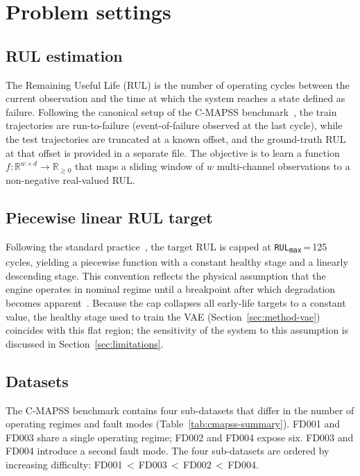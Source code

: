 \documentclass[5p,times,authoryear]{elsarticle}
\begin{document}
\section{Problem settings}\label{sec:problem}

\subsection{RUL estimation}\label{sec:problem-rul}

The Remaining Useful Life (RUL) is the number of operating cycles between the current observation and the time at which the system reaches a state defined as failure. Following the canonical setup of the C-MAPSS benchmark~\citep{saxena2008damage}, the train trajectories are run-to-failure (event-of-failure observed at the last cycle), while the test trajectories are truncated at a known offset, and the ground-truth RUL at that offset is provided in a separate file. The objective is to learn a function $f: \mathbb{R}^{w\times d}\to\mathbb{R}_{\ge 0}$ that maps a sliding window of $w$ multi-channel observations to a non-negative real-valued RUL.

\subsection{Piecewise linear RUL target}\label{sec:problem-target}

Following the standard practice~\citep{heimes2008recurrent,li2018remaining}, the target RUL is capped at \texttt{RUL\textsubscript{max}}\,=\,125\,cycles, yielding a piecewise function with a constant healthy stage and a linearly descending stage. This convention reflects the physical assumption that the engine operates in nominal regime until a breakpoint after which degradation becomes apparent~\citep{costa2022rve}. Because the cap collapses all early-life targets to a constant value, the healthy stage used to train the VAE (Section~\ref{sec:method-vae}) coincides with this flat region; the sensitivity of the system to this assumption is discussed in Section~\ref{sec:limitations}.

\subsection{Datasets}\label{sec:problem-data}

The C-MAPSS benchmark contains four sub-datasets that differ in the number of operating regimes and fault modes (Table~\ref{tab:cmapss-summary}). FD001 and FD003 share a single operating regime; FD002 and FD004 expose six. FD003 and FD004 introduce a second fault mode. The four sub-datasets are ordered by increasing difficulty: FD001\,$<$\,FD003\,$<$\,FD002\,$<$\,FD004.
\end{document}
